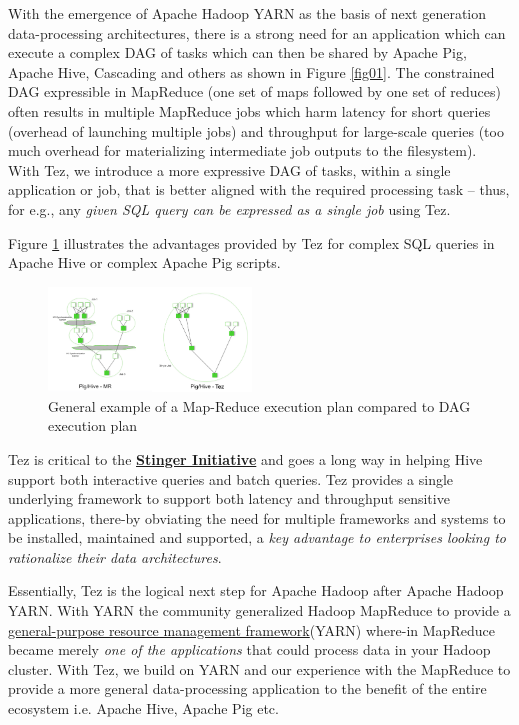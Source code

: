 \documentclass[twocolumn]{article}
\begin{document}
With the emergence of Apache Hadoop YARN as the basis of next generation
data-processing architectures, there is a strong need for an application
which can execute a complex DAG of tasks which can then be shared by
Apache Pig, Apache Hive, Cascading and others as shown in Figure \ref{fig01}. The constrained DAG
expressible in MapReduce (one set of maps followed by one set of
reduces) often results in multiple MapReduce jobs which harm latency for
short queries (overhead of launching multiple jobs) and throughput for
large-scale queries (too much overhead for materializing intermediate
job outputs to the filesystem). With Tez, we introduce a more expressive
DAG of tasks, within a single application or job, that is better aligned
with the required processing task -- thus, for e.g., any \emph{given SQL
query can be expressed as a single job} using Tez.

Figure \ref{fig02} illustrates the advantages provided by Tez for complex
SQL queries in Apache Hive or complex Apache Pig scripts.

\begin{figure}[htb]
        \centering
        \includegraphics[width=0.48\textwidth]{pighivetez.png}
        \caption{General example of a Map-Reduce execution plan compared to DAG execution plan}
        \label{fig02}
\end{figure}

Tez is critical to the
\href{http://hortonworks.com/blog/100x-faster-hive}{\textbf{Stinger
Initiative}} and goes a long way in helping Hive support both
interactive queries and batch queries. Tez provides a single underlying
framework to support both latency and throughput sensitive applications,
there-by obviating the need for multiple frameworks and systems to be
installed, maintained and supported, a \emph{key advantage to
enterprises looking to rationalize their data architectures}.

Essentially, Tez is the logical next step for Apache Hadoop after Apache
Hadoop YARN. With YARN the community generalized Hadoop MapReduce to
provide a
\href{http://hortonworks.com/blog/introducing-apache-hadoop-yarn/}{general-purpose
resource management framework}(YARN) where-in MapReduce became merely
\emph{one of the applications} that could process data in your Hadoop
cluster. With Tez, we build on YARN and our experience with the
MapReduce to provide a more general data-processing application to the
benefit of the entire ecosystem i.e. Apache Hive, Apache Pig etc.
\end{document}
